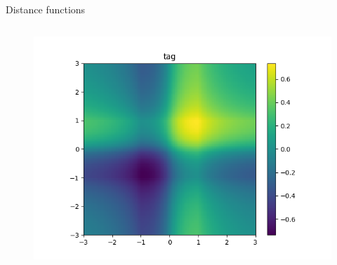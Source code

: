 \begin{frame}{\tciii{} Distance functions}
\begin{columns}
\begin{column}{0.35\linewidth}
\begin{figure}
\centering
\includegraphics[width=\linewidth]{images/GENE/images/distance_tag.png}
\end{figure}
\end{column}
\end{columns}

\end{frame}


    